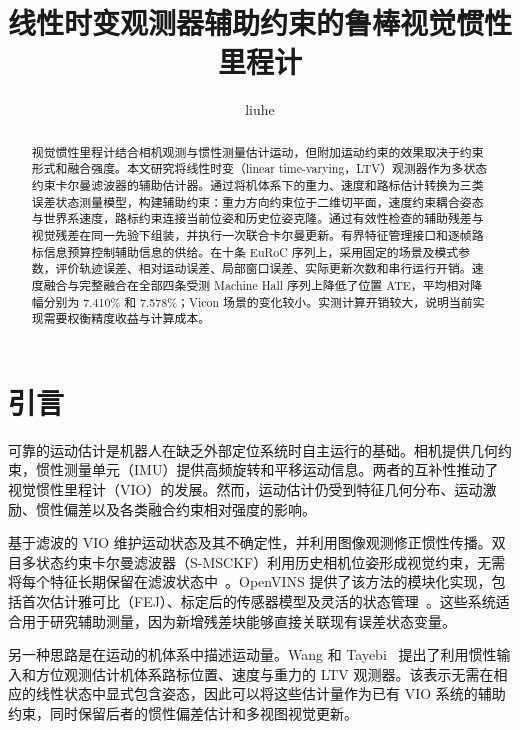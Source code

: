 \documentclass[a4paper,runningheads]{llncs}
\begin{document}
\title{线性时变观测器辅助约束的鲁棒视觉惯性里程计}
\author{liuhe}
\maketitle

\begin{abstract}
视觉惯性里程计结合相机观测与惯性测量估计运动，但附加运动约束的效果取决于约束形式和融合强度。本文研究将线性时变（linear time-varying，LTV）观测器作为多状态约束卡尔曼滤波器的辅助估计器。通过将机体系下的重力、速度和路标估计转换为三类误差状态测量模型，构建辅助约束：重力方向约束位于二维切平面，速度约束耦合姿态与世界系速度，路标约束连接当前位姿和历史位姿克隆。通过有效性检查的辅助残差与视觉残差在同一先验下组装，并执行一次联合卡尔曼更新。有界特征管理接口和逐帧路标信息预算控制辅助信息的供给。在十条 EuRoC 序列上，采用固定的场景及模式参数，评价轨迹误差、相对运动误差、局部窗口误差、实际更新次数和串行运行开销。速度融合与完整融合在全部四条受测 Machine Hall 序列上降低了位置 ATE，平均相对降幅分别为 7.410\% 和 7.578\%；Vicon 场景的变化较小。实测计算开销较大，说明当前实现需要权衡精度收益与计算成本。
\end{abstract}

\section{引言}
可靠的运动估计是机器人在缺乏外部定位系统时自主运行的基础。相机提供几何约束，惯性测量单元（IMU）提供高频旋转和平移运动信息。两者的互补性推动了视觉惯性里程计（VIO）的发展。然而，运动估计仍受到特征几何分布、运动激励、惯性偏差以及各类融合约束相对强度的影响。

基于滤波的 VIO 维护运动状态及其不确定性，并利用图像观测修正惯性传播。双目多状态约束卡尔曼滤波器（S-MSCKF）利用历史相机位姿形成视觉约束，无需将每个特征长期保留在滤波状态中~\cite{sun2018}。OpenVINS 提供了该方法的模块化实现，包括首次估计雅可比（FEJ）、标定后的传感器模型及灵活的状态管理~\cite{geneva2020}。这些系统适合用于研究辅助测量，因为新增残差块能够直接关联现有误差状态变量。

另一种思路是在运动的机体系中描述运动量。Wang 和 Tayebi~\cite{wang2024} 提出了利用惯性输入和方位观测估计机体系路标位置、速度与重力的 LTV 观测器。该表示无需在相应的线性状态中显式包含姿态，因此可以将这些估计量作为已有 VIO 系统的辅助约束，同时保留后者的惯性偏差估计和多视图视觉更新。
\end{document}
